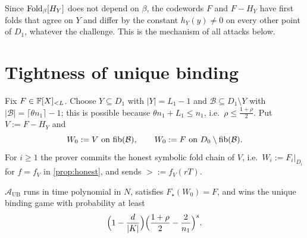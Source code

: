 Since $\mathrm{Fold}_\beta[H_Y]$ does not depend on $\beta$, the codewords $F$ and $F-H_Y$ have
first folds that agree on $Y$ and differ by the constant $h_Y(y)\ne0$ on every other
point of $D_1$, whatever the challenge. This is the mechanism of all attacks below.

\section{Tightness of unique binding}

\begin{definition}\label{def:attack-ub}
Fix $F\in\mathbb{F}[X]_{<L}$. Choose $Y\subseteq D_1$ with $|Y|=L_1-1$ and
$\mathcal B\subseteq D_1\setminus Y$ with $|\mathcal B|=\lceil\theta n_1\rceil-1$; this
is possible because $\theta n_1+L_1\le n_1$, i.e.\ $\rho\le\frac{1+\rho}2$. Put
$V:=F-H_Y$ and
\[
W_0:=V\ \text{on}\ \mathrm{fib}(\mathcal B),\qquad W_0:=F\ \text{on}\ D_0\setminus\mathrm{fib}(\mathcal B).
\]
For $i\ge1$ the prover commits the honest symbolic fold chain of $V$, i.e.\
$W_i:=F_i|_{D_i}$ for $f=f_V$ in \cref{prop:honest}, and sends $\gt:=f_V(rT)$.
\end{definition}

\begin{theorem}\label{thm:ub-tight}
$\mathcal A_{\mathrm{UB}}$ runs in time polynomial in $N$, satisfies
$F_\star(W_0)=F$, and wins the unique binding game with probability at least
\[
\Bigl(1-\frac d{|K|}\Bigr)\Bigl(\frac{1+\rho}2-\frac2{n_1}\Bigr)^{s}.
\]
\end{theorem}

